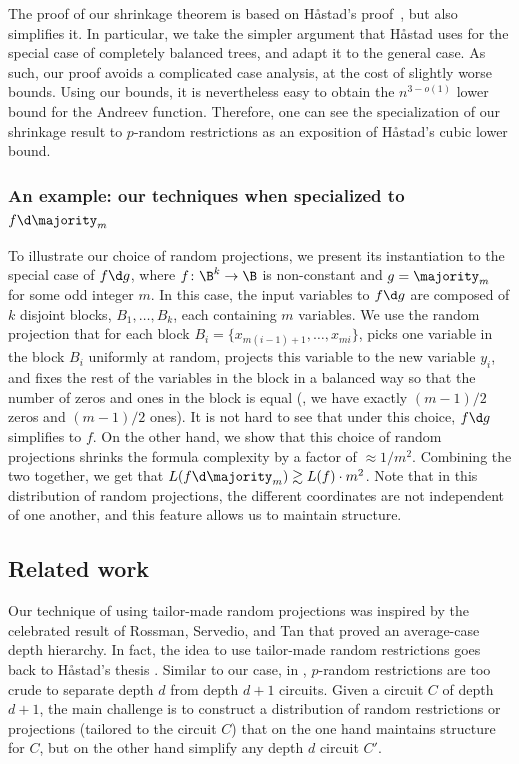 The proof of our shrinkage theorem is based on H{\aa}stad's proof~\cite{H98},
but also simplifies it. In particular, we take the simpler argument
that H{\aa}stad uses for the special case of completely balanced
trees, and adapt it to the general case. As such, our proof avoids
a complicated case analysis, at the cost of slightly worse bounds.
Using our bounds, it is nevertheless easy to obtain the $n^{3-o(1)}$
lower bound for the Andreev function. Therefore, one can see the specialization
of our shrinkage result to $p$-random restrictions as an exposition
of H{\aa}stad's cubic lower bound.

%
\subsubsection{An example: our techniques when specialized to $f\protect\d\protect\majority_{m}$}   %

To illustrate our choice of random projections, we present its instantiation
to the special case of $f\d g$, where $f\colon\B^{k}\to\B$ is non-constant
and $g=\majority_{m}$ for some odd integer $m$. In this case, the
input variables to $f\d g$ are composed of $k$ disjoint blocks,
$B_{1},\ldots,B_{k}$, each containing $m$ variables. We use the
random projection that for each block $B_{i}=\{x_{m(i-1)+1},\ldots,x_{mi}\}$,
picks one variable in the block $B_{i}$ uniformly at random, projects
this variable to the new variable $y_{i}$, and fixes the rest of
the variables in the block in a balanced way so that the number of
zeros and ones in the block is equal (\ie, we have exactly $(m-1)/2$
zeros and $(m-1)/2$ ones). It is not hard to see that under this
choice, $f\d g$ simplifies to $f$. On the other hand, we show that
this choice of random projections shrinks the formula complexity by
a factor of $\approx1/m^{2}$. Combining the two together, we get
that $L(f\d\majority_{m})\gtrsim L(f)\cdot m^{2}$. Note that in this
distribution of random projections, the different coordinates are
not independent of one another, and this feature allows us to maintain
structure.

\subsection{Related work}

Our technique of using tailor-made random projections was inspired
by the celebrated result of Rossman, Servedio, and Tan
%
\cite{HRST17}   %
that proved an average-case depth hierarchy. In fact, the idea to
use tailor-made random restrictions goes back to H{\aa}stad's thesis
\cite[Chapter~6.2]{H87}. Similar to our case, in
%
\cite{H87,HRST17},  %
$p$-random restrictions are too crude to separate depth $d$ from
depth $d+1$ circuits. Given a circuit $C$ of depth $d+1$, the main
challenge is to construct a distribution of random restrictions or
projections (tailored to the circuit $C$) that on the one hand maintains
structure for $C$, but on the other hand simplify any depth $d$
circuit $C'$.

